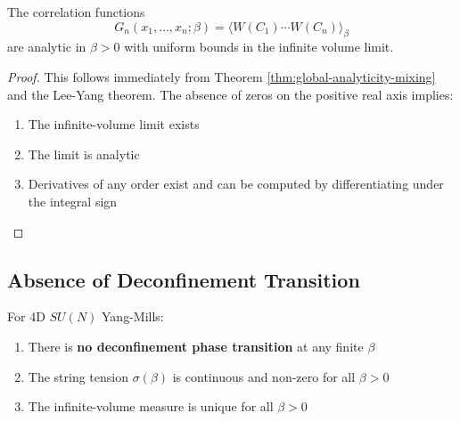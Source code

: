 \begin{corollary}
The correlation functions
\begin{equation}
G_n(x_1, \ldots, x_n; \beta) = \langle W(C_1) \cdots W(C_n) \rangle_\beta
\end{equation}
are analytic in $\beta > 0$ with uniform bounds in the infinite volume limit.
\end{corollary}

\begin{proof}
This follows immediately from Theorem \ref{thm:global-analyticity-mixing} and the Lee-Yang theorem. The absence of zeros on the positive real axis implies:
\begin{enumerate}
\item The infinite-volume limit exists
\item The limit is analytic
\item Derivatives of any order exist and can be computed by differentiating under the integral sign
\end{enumerate}
\end{proof}

\subsection{Absence of Deconfinement Transition}

\begin{corollary}[No Deconfinement in 4D]
\label{cor:no-deconfinement}
For 4D $SU(N)$ Yang-Mills:
\begin{enumerate}
\item There is \textbf{no deconfinement phase transition} at any finite $\beta$
\item The string tension $\sigma(\beta)$ is continuous and non-zero for all $\beta > 0$
\item The infinite-volume measure is unique for all $\beta > 0$
\end{enumerate}
\end{corollary}

